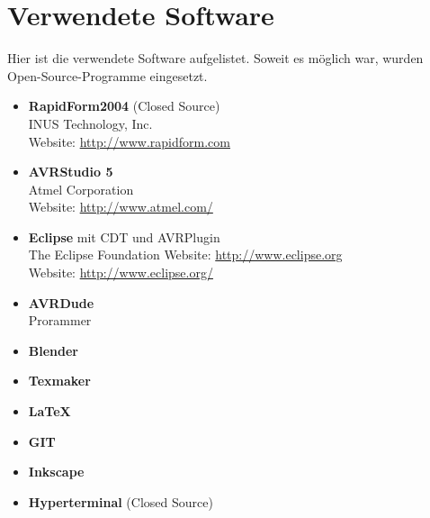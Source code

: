 \section{Verwendete Software}
\label{sec:V_Software}
Hier ist die verwendete Software aufgelistet. Soweit es möglich war, wurden Open-Source-Programme eingesetzt.
\begin{itemize}
\item \textbf{RapidForm2004} (Closed Source)\\
INUS Technology, Inc.\\
Website: \url{http://www.rapidform.com}
\item \textbf{AVRStudio 5} \\
Atmel Corporation \\
Website: \url{http://www.atmel.com/}  
\item \textbf{Eclipse} mit CDT und AVRPlugin\\
The Eclipse Foundation
Website: \url{http://www.eclipse.org}
\\
Website: \url{http://www.eclipse.org/}  
\item \textbf{AVRDude} \\
Prorammer \\
\item \textbf{Blender}\\
\item \textbf{Texmaker}\\
\item \textbf{LaTeX}\\
\item \textbf{GIT}\\
\item \textbf{Inkscape}\\

\item \textbf{Hyperterminal} (Closed Source)\\

\end{itemize}

\\